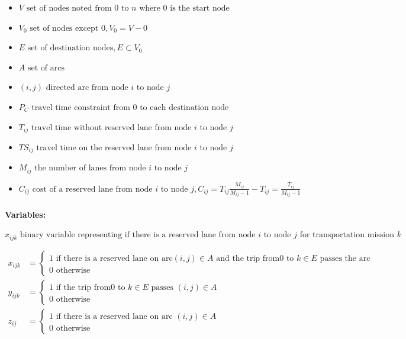 \documentclass{article}
\begin{document}
\begin{itemize}
  \item $V \text{ set of nodes noted from } 0 \text{ to } n \text{ where } 0 \text{ is the start node}$
  \item $V_0 \text{ set of nodes except } 0, V_0 = V - {0}$
  \item $E \text{ set of destination nodes}, E \subset V_0$
  \item $A \text{ set of arcs}$
  \item $(i, j) \text{ directed arc from node } i \text{ to node } j$
  \item $P_C \text{ travel time constraint from } 0 \text{ to each destination node}$
  \item $T_{ij} \text{ travel time without reserved lane from node } i \text{ to node } j$
  \item $TS_{ij} \text{ travel time on the reserved lane from node } i \text{ to node } j$
  \item $M_{ij} \text{ the number of lanes from node } i \text{ to node } j$
  \item $C_{ij} \text{ cost of a reserved lane from node } i \text{ to node } j, C_{ij} = T_{ij}\frac{M_{ij}}{M_{ij}-1} - T_{ij} = \frac{T_{ij}}{M_{ij}-1}$
\end{itemize}

\paragraph{Variables:}

$$x_{ijk} \text{ binary variable representing if there is a reserved lane from node } i \text{ to node } j \text{ for transportation mission } k$$

\begin{equation*}
  \begin{aligned}
    x_{ijk}&=
    \left\{
      \begin{array}{ll}
        1 \text{ if there is a reserved lane on arc}(i,j)\in A \text{ and the trip from} 0 \text{ to } k \in E \text{ passes the arc}\\
        0 \text{ otherwise}
      \end{array} 
    \right.\\
      y_{ijk}&=
    \left\{
      \begin{array}{ll}
        1 \text{ if the trip from} 0 \text{ to } k \in E \text{ passes } (i, j) \in A\\
        0 \text{ otherwise}
      \end{array} 
    \right.\\
    z_{ij}&=
    \left\{
      \begin{array}{ll}
        1 \text{ if there is a reserved lane on arc } (i, j) \in A\\
        0 \text{ otherwise}
      \end{array} 
    \right.
  \end{aligned}
\end{equation*}
\end{document}
